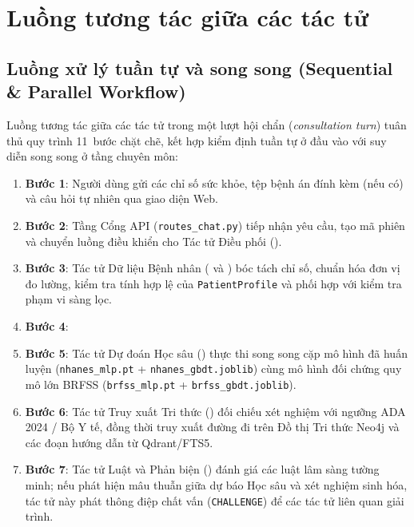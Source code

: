 \chapter{Luồng tương tác giữa các tác tử}
\label{chap:workflow}

\section{Luồng xử lý tuần tự và song song (Sequential \& Parallel Workflow)}
\label{sec:sequential-workflow}

Luồng tương tác giữa các tác tử trong một lượt hội chẩn (\emph{consultation turn}) tuân thủ quy trình 11~bước chặt chẽ, kết hợp kiểm định tuần tự ở đầu vào với suy diễn song song ở tầng chuyên môn:

\begin{enumerate}
  \item \textbf{Bước 1}: Người dùng gửi các chỉ số sức khỏe, tệp bệnh án đính kèm (nếu có) và câu hỏi tự nhiên qua giao diện Web.
  \item \textbf{Bước 2}: Tầng Cổng API (\texttt{routes\_chat.py}) tiếp nhận yêu cầu, tạo mã phiên và chuyển luồng điều khiển cho Tác tử Điều phối ().
  \item \textbf{Bước 3}: Tác tử Dữ liệu Bệnh nhân ( và ) bóc tách chỉ số, chuẩn hóa đơn vị đo lường, kiểm tra tính hợp lệ của \texttt{PatientProfile} và phối hợp với  kiểm tra phạm vi sàng lọc.
  \item \textbf{Bước 4}: 
  \item \textbf{Bước 5}: Tác tử Dự đoán Học sâu () thực thi song song cặp mô hình đã huấn luyện (\texttt{nhanes\_mlp.pt} + \texttt{nhanes\_gbdt.joblib}) cùng mô hình đối chứng quy mô lớn BRFSS (\texttt{brfss\_mlp.pt} + \texttt{brfss\_gbdt.joblib}).
  \item \textbf{Bước 6}: Tác tử Truy xuất Tri thức () đối chiếu xét nghiệm với ngưỡng ADA 2024 / Bộ Y tế, đồng thời truy xuất đường đi trên Đồ thị Tri thức Neo4j và các đoạn hướng dẫn từ Qdrant/FTS5.
  \item \textbf{Bước 7}: Tác tử Luật và Phản biện () đánh giá các luật lâm sàng tường minh; nếu phát hiện mâu thuẫn giữa dự báo Học sâu và xét nghiệm sinh hóa, tác tử này phát thông điệp chất vấn (\texttt{CHALLENGE}) để các tác tử liên quan giải trình.

\end{enumerate}
